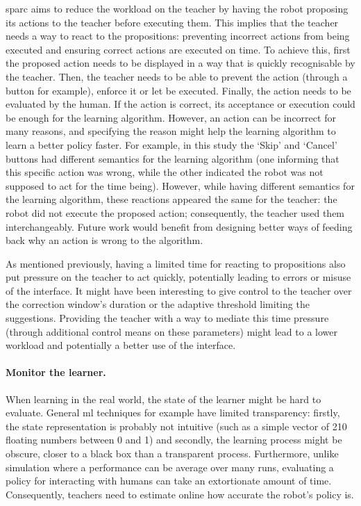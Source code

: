 \gls{sparc} aims to reduce the workload on the teacher by having the robot proposing its actions to the teacher before executing them. This implies that the teacher needs a way to react to the propositions: preventing incorrect actions from being executed and ensuring correct actions are executed on time. To achieve this, first the proposed action needs to be displayed in a way that is quickly recognisable by the teacher. Then, the teacher needs to be able to prevent the action (through a button for example), enforce it or let be executed. Finally, the action needs to be evaluated by the human. If the action is correct, its acceptance or execution could be enough for the learning algorithm. However, an action can be incorrect for many reasons, and specifying the reason might help the learning algorithm to learn a better policy faster. For example, in this study the `Skip' and `Cancel' buttons had different semantics for the learning algorithm (one informing that this specific action was wrong, while the other indicated the robot was not supposed to act for the time being). However, while having different semantics for the learning algorithm, these reactions appeared the same for the teacher: the robot did not execute the proposed action; consequently, the teacher used them interchangeably. Future work would benefit from designing better ways of feeding back why an action is wrong to the algorithm.

As mentioned previously, having a limited time for reacting to propositions also put pressure on the teacher to act quickly, potentially leading to errors or misuse of the interface. It might have been interesting to give control to the teacher over the correction window's duration or the adaptive threshold limiting the suggestions. Providing the teacher with a way to mediate this time pressure (through additional control means on these parameters) might lead to a lower workload and potentially a better use of the interface. 

\paragraph{Monitor the learner.}

When learning in the real world, the state of the learner might be hard to evaluate. General \gls{ml} techniques for example have limited transparency: firstly, the state representation is probably not intuitive (such as a simple vector of 210 floating numbers between 0 and 1) and secondly, the learning process might be obscure, closer to a black box than a transparent process. Furthermore, unlike simulation where a performance can be average over many runs, evaluating a policy for interacting with humans can take an extortionate amount of time. Consequently, teachers need to estimate online how accurate the robot's policy is. 

